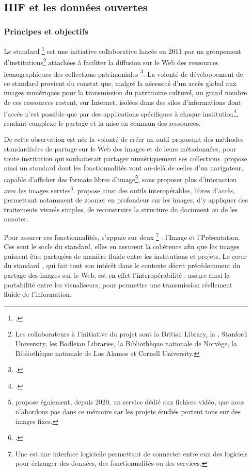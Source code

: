 
\subsection{IIIF et les données ouvertes}
    \subsubsection{Principes et objectifs}
	Le standard \iiif\footcite{IIIFInternationalImage} est une initiative collaborative lancée en 2011 par un groupement d'institutions\footnote{Les collaborateurs à l'initiative du projet sont la British Library, la \bnf, Stanford University, les Bodleian Libraries, la Bibliothèque nationale de Norvège, la Bibliothèque nationale de Los Alamos et Cornell University.} attachées à faciliter la diffusion sur le Web des ressources iconographiques des collections patrimoniales \footcite{cramerInternationalImageInteroperability2011}. La volonté de développement de ce standard provient du constat que, malgré la nécessité d'un accès global aux images numériques pour la transmission du patrimoine culturel, un grand nombre de ces ressources restent, sur Internet, isolées dans des silos d'informations dont l'accès n'est possible que par des applications spécifiques à chaque institution\footcite{cramerInternationalImageInteroperability2011}, rendant complexe le partage et la mise en commun des ressources.
	
	De cette observation est née la volonté de créer un outil proposant des méthodes standardisées de partage sur le Web des images et de leurs métadonnées, pour toute institution qui souhaiterait partager numériquement ses collections. \iiif propose ainsi un standard dont les fonctionnalités vont au-delà de celles d'un navigateur, capable d'afficher des formats libres d'image\footnote{\iiif propose également, depuis 2020, un service dédié aux fichiers vidéo, que nous n'abordons pas dans ce mémoire car les projets étudiés portent tous sur des images fixes.}, sans proposer plus d'interaction avec les images servies\footcite{HowItWorks}. \iiif propose ainsi des outils interopérables, libres d'accès, permettant notamment de zoomer en profondeur sur les images, d'y appliquer des traitements visuels simples, de reconstruire la structure du document ou de les annoter.
	
	Pour assurer ces fonctionnalités, \iiif s'appuie sur deux \api\footnote{Une \api est une interface logicielle permettant de connecter entre eux des logiciels pour échanger des données, des fonctionnalités ou des services.} : l'\api Image et l'\api Présentation. Ces \api sont le socle du standard, elles en assurent la cohérence afin que les images puissent être partagées de manière fluide entre les institutions et projets. Le cœur du standard \iiif, qui fait tout son intérêt dans le contexte décrit précédemment du partage des images sur le Web, est en effet l'interopérabilité : \iiif assure ainsi la portabilité entre les visualiseurs, pour permettre une transmission réellement fluide de l'information.
    
